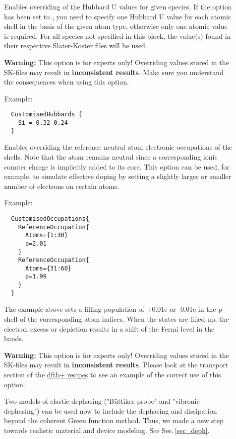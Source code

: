 \begin{description}
\item[] Enables overriding of the Hubbard U values for given species. If the
  option  has been set to , you need to specify one Hubbard U value
  for each atomic shell in the basis of the given atom type, otherwise only one atomic value is
  required. For all species not specified in this block, the value(s) found in their respective
  Slater-Koster files will be used.

  \textbf{Warning:} This option is for experts only! Overriding values stored in the SK-files may
  result in \textbf{inconsistent results}. Make sure you understand the consequences when using this
  option.

  Example:
  \begin{verbatim}
  CustomisedHubbards {
    Si = 0.32 0.24
  }
  \end{verbatim}

\item[] Enables overriding the reference neutral atom
  electronic occupations of the shells. Note that the atom remains neutral since
  a corresponding ionic counter charge is implicitly added to its core. This
  option can be used, for example, to simulate effective doping by setting a
  slightly larger or smaller number of electrons on certain atoms.

  Example:
  \begin{verbatim}
  CustomisedOccupations{
    ReferenceOccupation{
      Atoms={1:30}
      p=2.01
    }
    ReferenceOccupation{
      Atoms={31:60}
      p=1.99
    }
  }
  \end{verbatim}
  
  The example above sets a filling population of +0.01e or -0.01e in the p shell
  of the corresponding atom indices. When the states are filled up, the electron
  excess or depletion results in a shift of the Fermi level in the bands.

  \textbf{Warning:} This option is for experts only! Overriding values stored in
  the SK-files may result in \textbf{inconsistent results}. Please look at the
  transport section of the
  \href{https://dftbplus-recipes.readthedocs.io/en/latest/}{dftb+ recipes} to
  see an example of the correct use of this option.

\item[] Two models of elastic dephasing ("B\"uttiker probe" and "vibronic dephasing") can be used now to include the dephasing and dissipation beyond the coherent Green function method. Thus, we made a new step towards realistic material and device modeling. See Sec.\,\ref{sec_deph}. 


\end{description}
